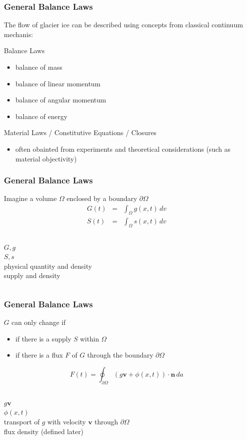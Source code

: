 \documentclass[hide notes,intlimits]{beamer}
\begin{document}
\begin{frame}
  \frametitle{General Balance Laws}
  The flow of glacier ice can be described using concepts from classical continuum mechanis:
  \begin{block}{Balance Laws}
    \begin{itemize}
    \item balance of mass
    \item balance of linear momentum
    \item balance of angular momentum
    \item balance of energy
    \end{itemize}
  \end{block}
  \begin{block}{Material Laws / Constitutive Equations / Closures}
    \begin{itemize}
      \item often obainted from experiments and theoretical considerations (such as material objectivity)
   \end{itemize}
  \end{block}
\end{frame}


\begin{frame}
  \frametitle{General Balance Laws}
  Imagine a volume $\Omega$ enclosed by a boundary $\partial \Omega$
   \begin{eqnarray}
      G(t) &=& \int_{\Omega} g(x,t)\,d v \\
      S(t) &=& \int_{\Omega} s(x,t)\,d v
    \end{eqnarray}
    \begin{columns}
      \column[C]{0.1cm}
      $G,g$ \\
      $S,s$ \\
     \column[C]{6cm}
      physical quantity and density\\
      supply and density \\
   \end{columns}
\end{frame}


\begin{frame}
  \frametitle{General Balance Laws}
  $G$ can only change if
 \begin{itemize}
   \item if there is a supply $S$ within $\Omega$
   \item if there is a flux $F$ of $G$ through the boundary $\partial \Omega$
  \end{itemize}
  \begin{equation}
   F(t) = \oint_{\partial \Omega} \left(g\mathbf{v} + \phi(x,t)\right) \cdot \mathbf{n}\,da
   \end{equation}
    \begin{columns}
      \column[C]{0.1cm}
      $g\mathbf{v}$ \\
      $\phi(x,t)$ \\
     \column[C]{7cm}
      transport of $g$ with velocity $\mathbf{v}$ through $\partial \Omega$\\
      flux density (defined later) \\
   \end{columns}
\end{frame}
\end{document}

